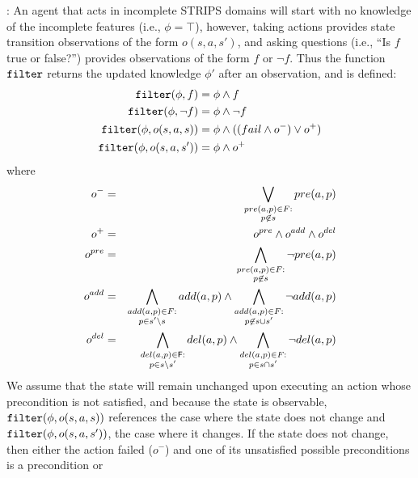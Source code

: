 \documentclass{article}
\def\und#1{\noindent{\bf #1}:}
\begin{document}
\und{Filtering Observations} An agent that acts in incomplete STRIPS domains
will start with no knowledge of the incomplete features (i.e., $\phi = \top$),
however, taking actions provides state transition observations of the form $o(s,
a, s')$, and asking questions (i.e., ``Is $f$ true or false?'') provides
observations of the form $f$ or $\neg f$.  Thus the function ${\tt filter}$
returns the updated knowledge $\phi'$ after an observation, and is
defined:
\begin{align*}
{\tt filter}(\phi, f) & = \phi \wedge f \\
{\tt filter}(\phi, \neg f) & = \phi \wedge \neg f \\
{\tt filter}(\phi, o(s, a, s)) & = \phi \wedge ((fail \wedge o^-) \vee  o^+)\\
{\tt filter}(\phi, o(s, a, s')) & = \phi \wedge  o^+
\end{align*}
 where 
\begin{eqnarray*}
o^- &=& \bigvee\limits_{\substack{pre({a},p) \in 
F:\\ p \not\in s} } pre({a},p) 
\label{eqn:update1} \\
o^+ &=& o^{pre} \wedge o^{add} \wedge o^{del}\label{eqn:update2}\\
o^{pre} &=& \bigwedge\limits_{\substack{pre({a},p)
 \in F:\\ p \not\in s} }\neg pre({a},p)
 \label{eqn:update3}  \\
o^{add} &=& \bigwedge\limits_{\substack{add({a},p) \in 
F:\\ p\in s'\backslash s} }add({a},p) 
  \wedge \bigwedge\limits_{\substack{add({a},p) \in 
  F: \\ p \not\in  s\cup s'}} \neg 
  add({a},p)   \label{eqn:update4}\\
o^{del} &=& 
\bigwedge\limits_{\substack{del({a},p) \in {\sf
F}: \\p \in s \backslash s'}}
del({a},p)  \wedge
\bigwedge\limits_{\substack{del({a},p)
\in F:\\ p \in s\cap s'}}\neg
del({a},p)  \label{eqn:update5}
\end{eqnarray*}
\noindent We assume that the state will remain unchanged upon executing
an action whose precondition is not satisfied, and because the
state is observable, ${\tt filter}(\phi, o(s, a, s))$ references the case where
the state does not change and ${\tt filter}(\phi, o(s, a, s'))$, the case where
it changes.  If the state does not change, then either the action failed
($o^-$) and one of its unsatisfied possible preconditions is a precondition  or
\end{document}

